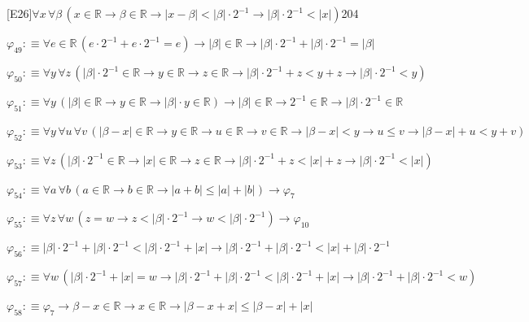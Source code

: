 \begin{fullproof}{[E26]}{$\forall x\,\forall \beta\,(x \in \mathbb{R} \to \beta \in \mathbb{R} \to \lvert x - \beta \rvert < \lvert \beta \rvert \cdot 2^{-1} \to \lvert \beta \rvert \cdot 2^{-1} < \lvert x \rvert)$}{204}
\begin{abbrevlist}
\item $\varphi_{49} :\equiv \forall e \in \mathbb{R}\,(e \cdot 2^{-1} + e \cdot 2^{-1} = e) \to \lvert \beta \rvert \in \mathbb{R} \to \lvert \beta \rvert \cdot 2^{-1} + \lvert \beta \rvert \cdot 2^{-1} = \lvert \beta \rvert$
\item $\varphi_{50} :\equiv \forall y\,\forall z\,(\lvert \beta \rvert \cdot 2^{-1} \in \mathbb{R} \to y \in \mathbb{R} \to z \in \mathbb{R} \to \lvert \beta \rvert \cdot 2^{-1} + z < y + z \to \lvert \beta \rvert \cdot 2^{-1} < y)$
\item $\varphi_{51} :\equiv \forall y\,(\lvert \beta \rvert \in \mathbb{R} \to y \in \mathbb{R} \to \lvert \beta \rvert \cdot y \in \mathbb{R}) \to \lvert \beta \rvert \in \mathbb{R} \to 2^{-1} \in \mathbb{R} \to \lvert \beta \rvert \cdot 2^{-1} \in \mathbb{R}$
\item $\varphi_{52} :\equiv \forall y\,\forall u\,\forall v\,(\lvert \beta - x \rvert \in \mathbb{R} \to y \in \mathbb{R} \to u \in \mathbb{R} \to v \in \mathbb{R} \to \lvert \beta - x \rvert < y \to u \leq v \to \lvert \beta - x \rvert + u < y + v)$
\item $\varphi_{53} :\equiv \forall z\,(\lvert \beta \rvert \cdot 2^{-1} \in \mathbb{R} \to \lvert x \rvert \in \mathbb{R} \to z \in \mathbb{R} \to \lvert \beta \rvert \cdot 2^{-1} + z < \lvert x \rvert + z \to \lvert \beta \rvert \cdot 2^{-1} < \lvert x \rvert)$
\item $\varphi_{54} :\equiv \forall a\,\forall b\,(a \in \mathbb{R} \to b \in \mathbb{R} \to \lvert a + b \rvert \leq \lvert a \rvert + \lvert b \rvert) \to \varphi_{7}$
\item $\varphi_{55} :\equiv \forall z\,\forall w\,(z = w \to z < \lvert \beta \rvert \cdot 2^{-1} \to w < \lvert \beta \rvert \cdot 2^{-1}) \to \varphi_{10}$
\item $\varphi_{56} :\equiv \lvert \beta \rvert \cdot 2^{-1} + \lvert \beta \rvert \cdot 2^{-1} < \lvert \beta \rvert \cdot 2^{-1} + \lvert x \rvert \to \lvert \beta \rvert \cdot 2^{-1} + \lvert \beta \rvert \cdot 2^{-1} < \lvert x \rvert + \lvert \beta \rvert \cdot 2^{-1}$
\item $\varphi_{57} :\equiv \forall w\,(\lvert \beta \rvert \cdot 2^{-1} + \lvert x \rvert = w \to \lvert \beta \rvert \cdot 2^{-1} + \lvert \beta \rvert \cdot 2^{-1} < \lvert \beta \rvert \cdot 2^{-1} + \lvert x \rvert \to \lvert \beta \rvert \cdot 2^{-1} + \lvert \beta \rvert \cdot 2^{-1} < w)$
\item $\varphi_{58} :\equiv \varphi_{7} \to \beta - x \in \mathbb{R} \to x \in \mathbb{R} \to \lvert \beta - x + x \rvert \leq \lvert \beta - x \rvert + \lvert x \rvert$

\end{abbrevlist}
\end{fullproof}
